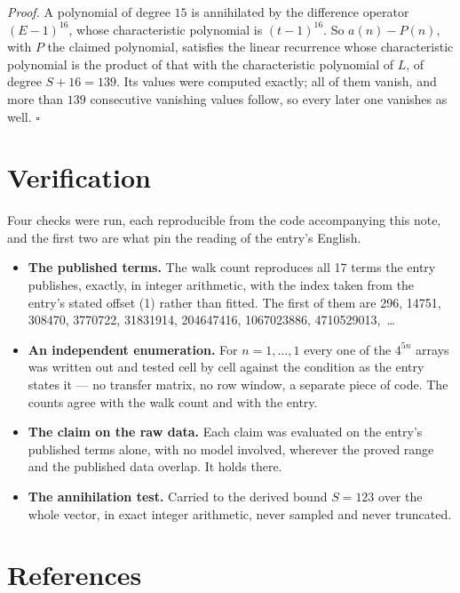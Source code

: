 \documentclass[11pt]{article}
\theoremstyle{definition}
\begin{document}
{\itshape Proof.} A polynomial of degree $15$ is annihilated by the difference operator $(E-1)^{16}$, whose characteristic polynomial is $(t-1)^{16}$. So $a(n) - P(n)$, with $P$ the claimed polynomial, satisfies the linear recurrence whose characteristic polynomial is the product of that with the characteristic polynomial of $L$, of degree $S + 16 = 139$. Its values were computed exactly; all of them vanish, and more than $139$ consecutive vanishing values follow, so every later one vanishes as well. $\square$

\section{Verification}

Four checks were run, each reproducible from the code accompanying this note, and the first two are what pin the reading of the entry's English.

\begin{itemize}

\item {\bfseries The published terms.} The walk count reproduces all 17 terms the entry publishes, exactly, in integer arithmetic, with the index taken from the entry's stated offset (1) rather than fitted. The first of them are 296, 14751, 308470, 3770722, 31831914, 204647416, 1067023886, 4710529013,~\dots

\item {\bfseries An independent enumeration.} For $n = 1,\dots,1$ every one of the $4^{5n}$ arrays was written out and tested cell by cell against the condition as the entry states it --- no transfer matrix, no row window, a separate piece of code. The counts agree with the walk count and with the entry.

\item {\bfseries The claim on the raw data.} Each claim was evaluated on the entry's published terms alone, with no model involved, wherever the proved range and the published data overlap. It holds there.

\item {\bfseries The annihilation test.} Carried to the derived bound $S = 123$ over the whole vector, in exact integer arithmetic, never sampled and never truncated.

\end{itemize}

\section{References}
\end{document}
